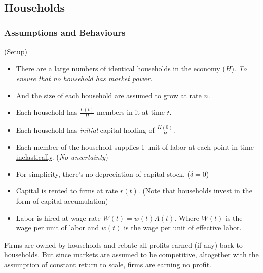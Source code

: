 \documentclass[11pt]{article}
\begin{document}
	\subsection{Households}
	\subsubsection{Assumptions and Behaviours}
	\begin{assumption}(Setup)
		\begin{itemize}
			\item There are a large numbers of \ul{identical} households in the economy ($H$). \emph{To ensure that \ul{no household has market power}.}
			\item And the size of each household are assumed to grow at rate $n$.
			\item Each household has $\frac{L(t)}{H}$ members in it at time $t$.
			\item Each household has \emph{initial} capital holding of $\frac{K(0)}{H}$.
			\item Each member of the household supplies 1 unit of labor at each point in time \ul{inelastically}. (\emph{No uncertainty})
			\item For simplicity, there's no depreciation of capital stock. ($\delta = 0$)
			\item Capital is rented to firms at rate $r(t)$. (Note that households invest in the form of capital accumulation)
			\item Labor is hired at wage rate $W(t) = w(t)A(t)$. Where $W(t)$ is the wage per unit of labor and $w(t)$ is the wage per unit of effective labor.
		\end{itemize}
	\end{assumption}
	
	\begin{remark}
		Firms are owned by households and rebate all profits earned (if any) back to households. But since markets are assumed to be competitive, altogether with the assumption of constant return to scale, firms are earning no profit.
	\end{remark}
	
\end{document}
